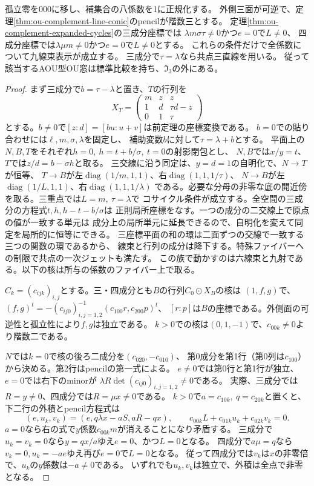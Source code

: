 \begin{proposition}[展開cycle表示の全係数判定]
\label{prop:ou-complement-uniform-cycles}
孤立零を$000$に移し、補集合の八係数を1に正規化する。
外側三面が可逆で、定理\ref{thm:ou-complement-line-conic}のpencilが階数三とする。
定理\ref{thm:ou-complement-expanded-cycles}の三成分座標では
$\lambda m\sigma\tau\ne0$かつ$e=0$で$L\ne0$、
四成分座標では$\lambda\mu m\ne0$かつ$e=0$で$L\ne0$とする。
これらの条件だけで全係数について九線束表示が成立する。
三成分で$\tau=\lambda$なら共点三直線を用いる。
従って該当するAOU型OU窓は標準比較を持ち、$\mathfrak I_3$の外にある。
\end{proposition}
\begin{proof}
まず三成分で$b=\tau-\lambda$と置き、$T$の行列を
\[
 X_T=\begin{pmatrix}m&z&z\\1&d&\tau d-z\\0&1&\tau\end{pmatrix}
\]
とする。$b\ne0$で$[z:d]=[bu:u+v]$は前定理の座標変換である。
$b=0$での貼り合わせには$\ell,m,\sigma,\lambda$を固定し、
補助変数$b$に対して$\tau=\lambda+b$とする。
平面上の$N,B,T$をそれぞれ$h=0,\ h=t+b/\sigma,\ t=0$の射影閉包とし、
$N,B$では$x/y=t$、$T$では$z/d=b-\sigma h$と取る。
三交線に沿う同定は、$y=d=1$の自明化で、$N\to T$が恒等、
$T\to B$が左$\operatorname{diag}(1/m,1,1)$、右$\operatorname{diag}(1,1,1/\tau)$、
$N\to B$が左$\operatorname{diag}(1/L,1,1)$、右$\operatorname{diag}(1,1,1/\lambda)$
である。必要な分母の非零な底の開近傍を取る。三重点では$L=m,\ \tau=\lambda$で
コサイクル条件が成立する。全空間の三成分の方程式$t,h,h-t-b/\sigma$は
正則局所座標をなす。一つの成分の二交線上で原点の値が一致する単元は
成分上の局所単元に延長できるので、自明化を変えて同定を局所的に恒等にできる。
三座標平面の和の環は二面ずつの交線で一致する三つの関数の環であるから、
線束と行列の成分は降下する。特殊ファイバーへの制限で共点の一次ジェットも満たす。
この族で動かすのは六線束と九射である。以下の核は所与の係数のファイバー上で取る。

$C_k=(c_{ijk})_{i,j}$とする。三・四成分とも$B$の行列$C_0\odot X_B$の核は
$(1,f,g)$で、$(f,g)^t=-(c_{ij0})_{i,j=1,2}^{-1}(c_{100}r,c_{200}p)^t$、
$[r:p]$は$B$の座標である。外側面の可逆性と孤立性により$f,g$は独立である。
$k>0$での核は$(0,1,-1)$で、$c_{00k}\ne0$より階数二である。

$N$では$k=0$で核の後ろ二成分を$(c_{020},-c_{010})$、
第0成分を第1行（第0列は$c_{100}$）から決める。第2行はpencilの第一式による。
$e\ne0$では第0行と第1行が独立、$e=0$では右下のminorが
$\lambda R\det(c_{ij0})_{i,j=1,2}\ne0$である。
実際、三成分では$R=y\ne0$、四成分では$R=\mu x\ne0$である。
$k>0$で$a=c_{10k},\ q=c_{20k}$と置くと、下二行の外積とpencil方程式は
\[
 (e,u_k,v_k)=(e,q\lambda x-a S,a R-qx),\qquad
 c_{00k}L+c_{01k}u_k+c_{02k}v_k=0 .
\]
$a=0$なら右の式で$y$係数$c_{00k}m$が消えることになり矛盾する。
三成分で$u_k=v_k=0$なら$y=qx/a$ゆえ$e=0$、かつ$L=0$となる。
四成分で$a\mu=q$なら$v_k=0,u_k=-a e$ゆえ再び$e=0$で$L=0$となる。
従って四成分では$v_k$は$x$の非零倍で、$u_k$の$y$係数は$-a\ne0$である。
いずれでも$u_k,v_k$は独立で、外積は全点で非零となる。


\end{proof}
